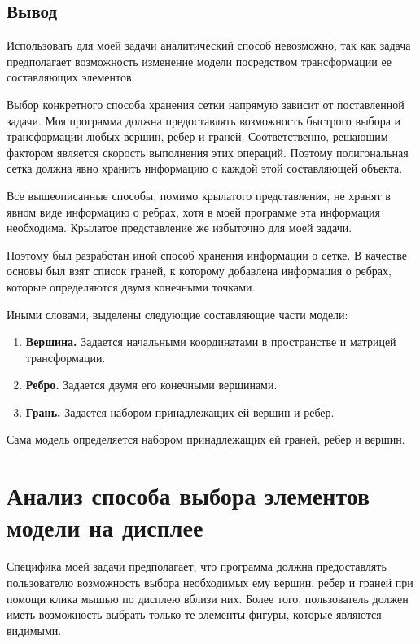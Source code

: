 \subsection*{Вывод}

Использовать для моей задачи аналитический способ невозможно, так как задача предполагает возможность изменение модели посредством трансформации ее составляющих элементов.

Выбор конкретного способа хранения сетки напрямую зависит от поставленной задачи. Моя программа должна предоставлять возможность быстрого выбора и трансформации любых вершин, ребер и граней. Соответственно, решающим фактором является скорость выполнения этих операций. Поэтому полигональная сетка должна явно хранить информацию о каждой этой составляющей объекта. 

Все вышеописанные способы, помимо крылатого представления, не хранят в явном виде информацию о ребрах, хотя в моей программе эта информация необходима. Крылатое представление же избыточно для моей задачи. 

Поэтому был разработан иной способ хранения информации о сетке. В качестве основы был взят список граней, к которому добавлена информация о ребрах, которые определяются двумя конечными точками. 

Иными словами, выделены следующие составляющие части модели:
\begin{enumerate}
	\item \textbf{Вершина.} Задается начальными координатами в пространстве и матрицей трансформации.
	
	\item \textbf{Ребро.} Задается двумя его конечными вершинами.
	
	\item \textbf{Грань.} Задается набором принадлежащих ей вершин и ребер.
	
\end{enumerate}

Сама модель определяется набором принадлежащих ей граней, ребер и вершин.

\section{Анализ способа выбора элементов модели на дисплее}

Специфика моей задачи предполагает, что программа должна предоставлять пользователю возможность выбора необходимых ему вершин, ребер и граней при помощи клика мышью по дисплею вблизи них. Более того, пользователь должен иметь возможность выбрать только те элементы фигуры, которые являются видимыми. 


